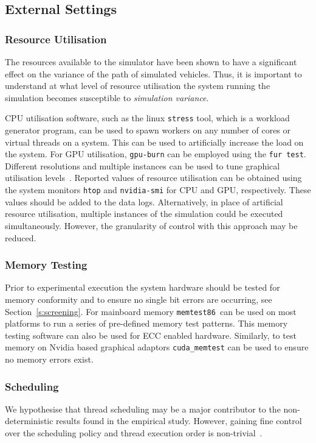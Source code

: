 \subsection{External Settings} \label{ego_actor}

\subsubsection{Resource Utilisation}
The resources available to the simulator have been shown to have a significant effect on the variance of the path of simulated vehicles. Thus, it is important to understand at what level of resource utilisation the system running the simulation becomes susceptible to \textit{simulation variance}.

CPU utilisation software, such as the linux \texttt{stress} tool, which is a workload generator program, can be used to spawn workers on any number of cores or virtual threads on a system. This can be used to artificially increase the load on the system. For GPU utilisation, \texttt{gpu-burn} can be employed using the \texttt{fur test}. Different resolutions and multiple instances can be used to tune graphical utilisation levels~\cite{GPU_stress}. Reported values of resource utilisation can be obtained using the system monitors \texttt{htop} and \texttt{nvidia-smi} for CPU and GPU, respectively. These values should be added to the data logs. Alternatively, in place of artificial resource utilisation, multiple instances of the simulation could be executed simultaneously. However, the granularity of control with this approach may be reduced.

\subsubsection{Memory Testing}
Prior to experimental execution the system hardware should be tested for memory conformity and to ensure no single bit errors are occurring, see Section~\ref{s:screening}. For mainboard memory \texttt{memtest86}\ can be used on most platforms to run a series of pre-defined memory test patterns. This memory testing software can also be used for ECC enabled hardware. Similarly, to test memory on Nvidia based graphical adaptors \texttt{cuda\_memtest} can be used to ensure no memory errors exist.

\subsubsection{Scheduling}
We hypothesise that thread scheduling may be a major contributor to the non-deterministic results found in the empirical study. However, gaining fine control over the scheduling policy and thread execution order is non-trivial~\cite{acm-q-rr-interview}. \DIFdelbegin %

